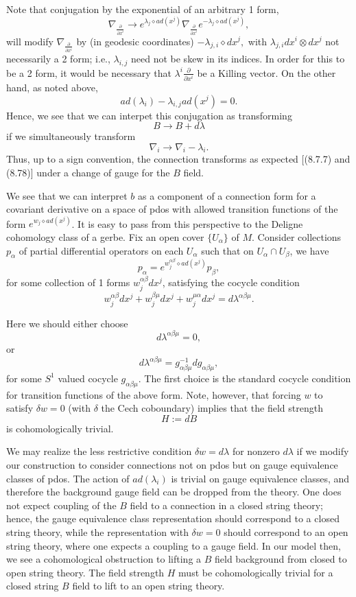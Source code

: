 \documentclass[a4paper,11pt]{amsart}
\begin{document}
Note that conjugation by the exponential of an arbitrary 1 form,
$$\nabla_{\frac{\partial}{\partial x^i}}\rightarrow 
e^{\lambda_{j}\diamond ad(x^j)}\nabla_{\frac{\partial}{\partial
x^i}}e^{-\lambda_{j}\diamond ad(x^j)},$$ 
will modify $\nabla_{\frac{\partial}{\partial x^i}}$ by (in geodesic
coordinates)
$-\lambda_{j,i}\diamond dx^j,$ with $\lambda_{j,i}dx^i\otimes dx^j$ not
 necessarily a 2 form;
i.e., $\lambda_{i,j}$ need not be skew in its indices. In order for this to be
 a 2 form, it would be necessary that
 $\lambda^i\frac{\partial}{\partial x^i}$ be a Killing vector. On the other
  hand, as noted above, 
 $$ad(\lambda_i) - \lambda_{i,j}ad(x^j) = 0.$$
 Hence, we see that we can interpet this conjugation as transforming 
  $$B\rightarrow B+d\lambda$$
   if we simultaneously transform 
 $$\nabla_i\rightarrow \nabla_i - \lambda_i.$$
 Thus, up to a sign convention, the connection transforms as expected \cite{P}[(8.7.7) and (8.78)]
  under a change of gauge for the $B$ field.   
 

We see that we can interpret $b$ as a component of a connection form for a
 covariant derivative on a space of pdos with allowed transition functions
  of the form $e^{w_j\diamond ad(x^j)}$. It is easy to pass from this 
  perspective to the Deligne cohomology class of a gerbe. 
  Fix an open cover $\{U_{\alpha}\}$ of $M$. Consider collections $p_{\alpha}$ 
   of partial differential operators on each $U_{\alpha}$ such
  that on $U_{\alpha}\cap U_{\beta}$, we have 
  $$p_{\alpha} = e^{w_j^{\alpha \beta}\diamond ad(x^j)}p_{\beta},$$
  for some collection of 1 forms $w_j^{\alpha \beta} dx^j$, satisfying the
  cocycle condition 
  $$w_j^{\alpha \beta} dx^j + w_j^{\beta \mu} dx^j + w_j^{\mu\alpha}
  dx^j = d\lambda^{\alpha\beta\mu}.$$
  
  Here we should either choose 
  $$d\lambda^{\alpha\beta\mu} = 0,$$
  or 
  $$d\lambda^{\alpha\beta\mu} = g_{\alpha\beta\mu}^{-1}dg_{\alpha\beta\mu},$$
  for some $S^1$ valued cocycle $g_{\alpha\beta\mu}$.  
The first choice is the standard cocycle condition for transition functions of
the above form. Note, however, that forcing $w$ to satisfy  $\delta w = 0$ 
(with $\delta$ the Cech coboundary) implies that the field strength 
$$H:=dB$$ 
is cohomologically trivial. 

We may realize the less restrictive condition $\delta w = d\lambda$ for 
nonzero $d\lambda$ if we modify our construction to consider connections not 
on pdos but on gauge equivalence classes of pdos. The action of
 $ad(\lambda_i)$ is trivial on gauge equivalence
classes, and therefore the background gauge field can be dropped from the theory.
One does not expect coupling of the $B$ field to a connection in a closed string
theory; hence, the gauge equivalence class representation should correspond to a
closed string theory, while the representation with $\delta w = 0$ should 
correspond to an open string theory, where one expects a coupling to a gauge
field. In our model then, we see a cohomological obstruction to lifting a $B$
field background from closed to open string theory. The field strength $H$ 
must be cohomologically trivial for a closed string $B$ field to lift to an open
string theory.
\end{document}
